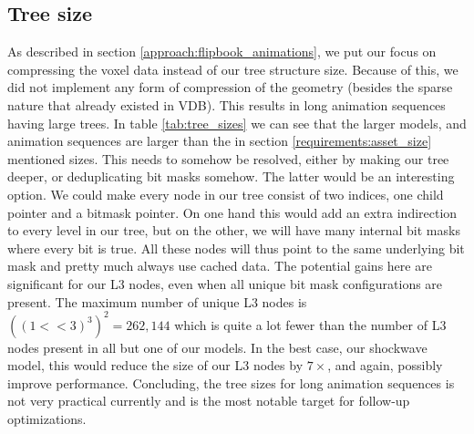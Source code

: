 \subsection{Tree size} \label{results:tree_size}
As described in section \ref{approach:flipbook_animations}, we put our focus on compressing the voxel data instead of our tree structure size. Because of this, we did not implement any form of compression of the geometry (besides the sparse nature that already existed in VDB). This results in long animation sequences having large trees. In table \ref{tab:tree_sizes} we can see that the larger models, and animation sequences are larger than the in section \ref{requirements:asset_size} mentioned sizes. This needs to somehow be resolved, either by making our tree deeper, or deduplicating bit masks somehow. The latter would be an interesting option. We could make every node in our tree consist of two indices, one child pointer and a bitmask pointer. On one hand this would add an extra indirection to every level in our tree, but on the other, we will have many internal bit masks where every bit is true. All these nodes will thus point to the same underlying bit mask and pretty much always use cached data. The potential gains here are significant for our L3 nodes, even when all unique bit mask configurations are present. The maximum number of unique L3 nodes is $((1<<3)^3)^2 = 262,144$ which is quite a lot fewer than the number of L3 nodes present in all but one of our models. In the best case, our shockwave model, this would reduce the size of our L3 nodes by $7\times$, and again, possibly improve performance. Concluding, the tree sizes for long animation sequences is not very practical currently and is the most notable target for follow-up optimizations.

